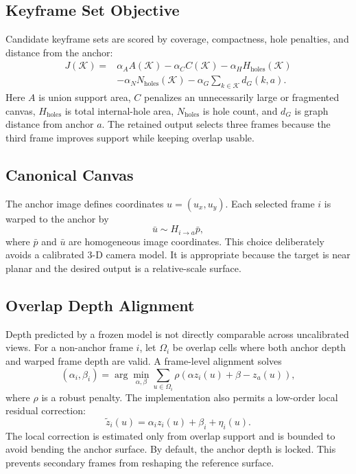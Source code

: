 \documentclass[conference]{IEEEtran}
\begin{document}
\subsection{Keyframe Set Objective}
Candidate keyframe sets are scored by coverage, compactness, hole penalties, and distance from the anchor:
\begin{equation}
\begin{aligned}
J(\mathcal{K})=&\alpha_A A(\mathcal{K})
-\alpha_C C(\mathcal{K})
-\alpha_H H_{\mathrm{holes}}(\mathcal{K})\\
&-\alpha_N N_{\mathrm{holes}}(\mathcal{K})
-\alpha_G \sum_{k\in \mathcal{K}} d_G(k,a).
\end{aligned}
\label{eq:keyframe_objective}
\end{equation}
Here $A$ is union support area, $C$ penalizes an unnecessarily large or fragmented canvas, $H_{\mathrm{holes}}$ is total internal-hole area, $N_{\mathrm{holes}}$ is hole count, and $d_G$ is graph distance from anchor $a$. The retained output selects three frames because the third frame improves support while keeping overlap usable.

\subsection{Canonical Canvas}
The anchor image defines coordinates $u=(u_x,u_y)$. Each selected frame $i$ is warped to the anchor by
\begin{equation}
\bar{u} \sim H_{i\rightarrow a}\bar{p},
\end{equation}
where $\bar{p}$ and $\bar{u}$ are homogeneous image coordinates. This choice deliberately avoids a calibrated 3-D camera model. It is appropriate because the target is near planar and the desired output is a relative-scale surface.

\subsection{Overlap Depth Alignment}
Depth predicted by a frozen model is not directly comparable across uncalibrated views. For a non-anchor frame $i$, let $\Omega_i$ be overlap cells where both anchor depth and warped frame depth are valid. A frame-level alignment solves
\begin{equation}
(\alpha_i,\beta_i)=\arg\min_{\alpha,\beta}
\sum_{u\in \Omega_i}\rho(\alpha z_i(u)+\beta-z_a(u)),
\label{eq:affine_depth}
\end{equation}
where $\rho$ is a robust penalty. The implementation also permits a low-order local residual correction:
\begin{equation}
\tilde{z}_i(u)=\alpha_i z_i(u)+\beta_i+\eta_i(u).
\end{equation}
The local correction is estimated only from overlap support and is bounded to avoid bending the anchor surface. By default, the anchor depth is locked. This prevents secondary frames from reshaping the reference surface.
\end{document}
